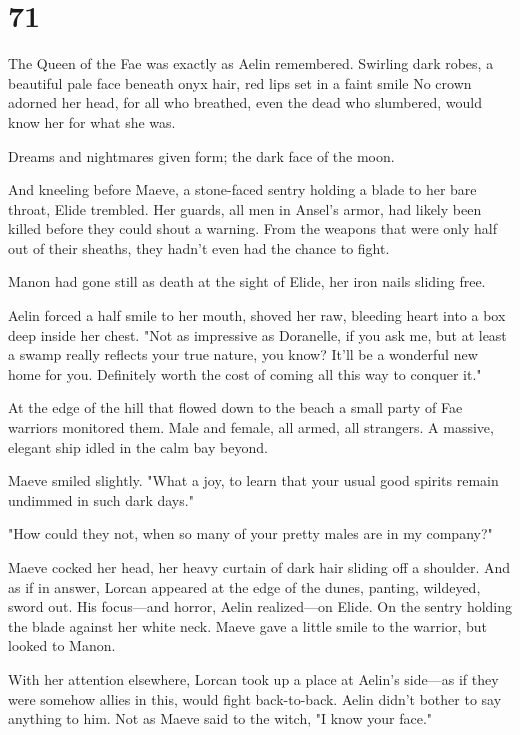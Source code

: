 
\chapter{71}

The Queen of the Fae was exactly as Aelin remembered. Swirling dark robes, a beautiful pale face beneath onyx hair, red lips set in a faint smile  No crown adorned her head, for all who breathed, even the dead who slumbered, would know her for what she was.

Dreams and nightmares given form; the dark face of the moon.

And kneeling before Maeve, a stone-faced sentry holding a blade to her bare throat, Elide trembled. Her guards, all men in Ansel's armor, had likely been killed before they could shout a warning. From the weapons that were only half out of their sheaths, they hadn't even had the chance to fight.

Manon had gone still as death at the sight of Elide, her iron nails sliding free.

Aelin forced a half smile to her mouth, shoved her raw, bleeding heart into a box deep inside her chest. "Not as impressive as Doranelle, if you ask me, but at least a swamp really reflects your true nature, you know? It'll be a wonderful new home for you. Definitely worth the cost of coming all this way to conquer it."

At the edge of the hill that flowed down to the beach a small party of Fae warriors monitored them. Male and female, all armed, all strangers. A massive, elegant ship idled in the calm bay beyond.

Maeve smiled slightly. "What a joy, to learn that your usual good spirits remain undimmed in such dark days."

"How could they not, when so many of your pretty males are in my company?"

Maeve cocked her head, her heavy curtain of dark hair sliding off a shoulder. And as if in answer, Lorcan appeared at the edge of the dunes, panting, wildeyed, sword out. His focus---and horror, Aelin realized---on Elide. On the sentry holding the blade against her white neck. Maeve gave a little smile to the warrior, but looked to Manon.

With her attention elsewhere, Lorcan took up a place at Aelin's side---as if they were somehow allies in this, would fight back-to-back. Aelin didn't bother to say anything to him. Not as Maeve said to the witch, "I know your face."

